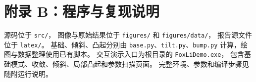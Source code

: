 \documentclass[UTF8,a4paper,12pt]{ctexart}
\begin{document}
\endgroup
\clearpage
\section*{附录 B：程序与复现说明}
源码位于 \texttt{src/}，
图像与原始结果位于 \texttt{figures/} 和 \texttt{figures/data/}，
报告源文件位于 \texttt{latex/}。
基础、倾斜、凸起分别由 \texttt{base.py}、\texttt{tilt.py}、\texttt{bump.py} 计算，绘图与数据整理使用已有脚本。
交互演示入口为根目录的 \texttt{FoxLiDemo.exe}，
包含基础模式、收敛、倾斜、局部凸起和参数扫描页面。
完整环境、参数和编译步骤见随附运行说明。



\end{document}
